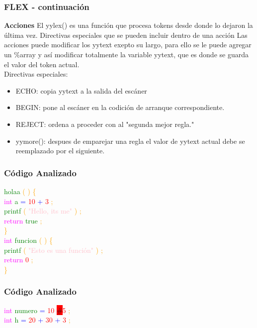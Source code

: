 \documentclass{beamer}
\begin{document}
\begin{frame}
\frametitle{FLEX - continuaci\'on} 
\textbf{Acciones} \newline 
El yylex() es una funci\'on que procesa tokens desde donde lo dejaron la \'ultima vez. Directivas especiales que se pueden incluir dentro de una acci\'on \newline 
Las acciones puede modificar los yytext exepto su largo, para ello se le puede agregar un \%array y as\'i modificar totalmente la variable yytext, que es donde se guarda el valor del token actual.\\Directivas especiales:\begin{itemize} \item ECHO: copia yytext a la salida del esc\'aner  \item BEGIN: pone al esc\'aner en la codici\'on de arranque correspondiente. \item REJECT: ordena a proceder con al "segunda mejor regla." \item yymore(): despues de emparejar una regla el valor de yytext actual debe se reemplazado por el siguiente.\end{itemize}\end{frame}
\begin{frame}
\frametitle{C\'odigo Analizado}
\textcolor{green}{holaa} \textcolor{orange}{(} \textcolor{orange}{)} \textcolor{orange}{\{} \\ 
 \textcolor{magenta}{int} \textcolor{green}{a} \textcolor{blue}{=} \textcolor{red}{10} \textcolor{blue}{+} \textcolor{red}{3} \textcolor{orange}{;} \\ 
 \textcolor{green}{printf} \textcolor{orange}{(} \textcolor{pink}{"Hello, its me"} \textcolor{orange}{)} \textcolor{orange}{;} \\ 
 \textcolor{magenta}{return} \textcolor{green}{true} \textcolor{orange}{;} \\ 
 \textcolor{orange}{\}} \\ 
 \textcolor{magenta}{int} \textcolor{green}{funcion} \textcolor{orange}{(} \textcolor{orange}{)} \textcolor{orange}{\{} \\ 
 \textcolor{green}{printf} \textcolor{orange}{(} \textcolor{pink}{"Esto es una función"} \textcolor{orange}{)} \textcolor{orange}{;} \\ 
 \textcolor{magenta}{return} \textcolor{red}{0} \textcolor{orange}{;} \\ 
 \textcolor{orange}{\}} \\ 
 \end{frame}
\begin{frame}
\frametitle{C\'odigo Analizado}
\textcolor{magenta}{int} \textcolor{green}{numero} \textcolor{blue}{=} \textcolor{red}{10} \colorbox{red}{\#}\textcolor{red}{5} \textcolor{orange}{;} \\ 
 \textcolor{magenta}{int} \textcolor{green}{h} \textcolor{blue}{=} \textcolor{red}{20} \textcolor{blue}{+} \textcolor{red}{30} \textcolor{blue}{+} \textcolor{red}{3} \textcolor{orange}{;} \\ 
 \textcolor{white}{} \end{frame}
\end{document}
